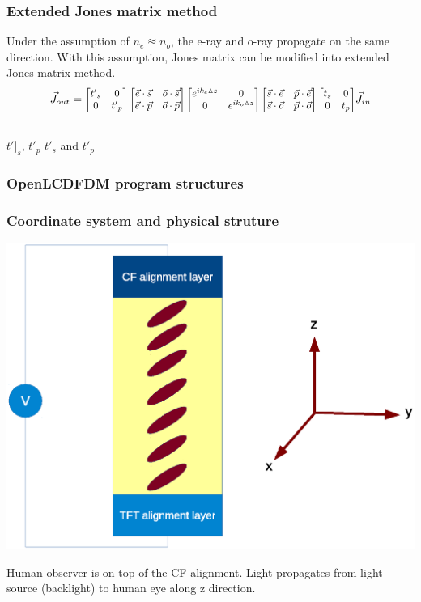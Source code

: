 \documentclass{beamer}
\newcommand\scalemath[2]{\scalebox{#1}{\mbox{\ensuremath{\displaystyle #2}}}} %
\begin{document}
\begin{frame}
\frametitle{Extended Jones matrix method}
Under the assumption of $n_e \approxeq n_o$, the e-ray and o-ray propagate on the same direction. With this assumption, Jones matrix can be modified into extended Jones matrix method.
\begin{eqnarray}
\vec{J}_{out} = 
\scalemath{0.9}{
\begin{bmatrix}
{t'}_s & 0 \\ 0 & {t'}_p
\end{bmatrix}
\begin{bmatrix}
\vec{e}\cdot\vec{s} & \vec{o}\cdot\vec{s} \\ \vec{e}\cdot\vec{p} & \vec{o}\cdot\vec{p}
\end{bmatrix}
\begin{bmatrix}
e^{ik_e\vartriangle z} & 0 \\ 0 & e^{ik_o\vartriangle z}
\end{bmatrix}
\begin{bmatrix}
\vec{s}\cdot\vec{e} & \vec{p}\cdot\vec{e} \\ \vec{s}\cdot\vec{o} & \vec{p}\cdot\vec{o}
\end{bmatrix}
\begin{bmatrix}
t_s & 0 \\ 0 & t_p
\end{bmatrix}
}
\vec{J}_{in} \\ \nonumber
\nonumber
\label{eq:extendedJones}
\end{eqnarray}
${t']}_s$, ${t'}_p$ ${t'}_s$ and ${t'}_p$
\end{frame}
\begin{frame}
\frametitle{OpenLCDFDM program structures}
\end{frame}
\begin{frame}
\frametitle{Coordinate system and physical struture}
\begin{center}
\includegraphics[scale=0.38]{OneDimension_Coordinate.eps}
\end{center}
Human observer is on top of the CF alignment. Light propagates from light source (backlight) to human eye along z direction.

\end{frame}
\end{document}
